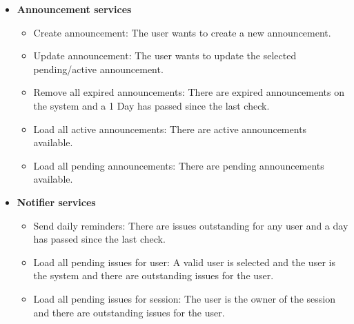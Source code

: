 \documentclass[12pt]{article}
\begin{document}
\begin{itemize}
	\item \textbf{Announcement services}
		\begin{itemize}
			\item Create announcement: The user wants to create a new announcement.
			\item Update announcement: The user wants to update the selected pending/active announcement.
			\item Remove all expired announcements: There are expired announcements on the system and a 1 Day has passed since the last check.
			\item Load all active announcements: There are active announcements available.
			\item Load all pending announcements: There are pending announcements available. 				
		\end{itemize}
		
	\item \textbf{Notifier services}
		\begin{itemize}
			\item Send daily reminders: There are issues outstanding for any user and a day has passed since the last check.
			\item Load all pending issues for user: A valid user is selected and the user is the system and there are outstanding issues for the user.	
			\item Load all pending issues for session: The user is the owner of the session and there are outstanding issues for the user.				
		\end{itemize}
		

\end{itemize}
\end{document}
